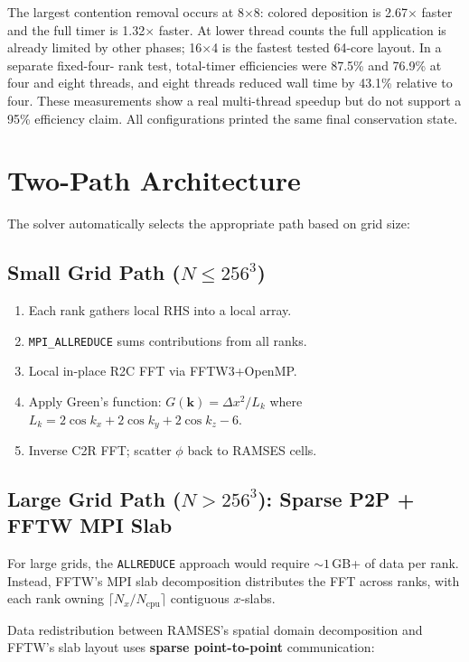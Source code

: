 \documentclass[11pt,fleqn]{book}
\begin{document}
The largest contention removal occurs at 8$\times$8: colored deposition is
2.67$\times$ faster and the full timer is 1.32$\times$ faster.  At lower
thread counts the full application is already limited by other phases;
16$\times$4 is the fastest tested 64-core layout.  In a separate fixed-four-
rank test, total-timer efficiencies were 87.5\% and 76.9\% at four and eight
threads, and eight threads reduced wall time by 43.1\% relative to four.
These measurements show a real multi-thread speedup but do not support a
95\% efficiency claim.  All configurations printed the same final
conservation state.

\section{Two-Path Architecture}

The solver automatically selects the appropriate path based on grid size:

\subsection{Small Grid Path ($N \le 256^3$)}

\begin{enumerate}[nosep]
  \item Each rank gathers local RHS into a local array.
  \item \texttt{MPI\_ALLREDUCE} sums contributions from all ranks.
  \item Local in-place R2C FFT via FFTW3+OpenMP.
  \item Apply Green's function: $G(\mathbf{k}) = \Delta x^2 / L_k$ where $L_k = 2\cos k_x + 2\cos k_y + 2\cos k_z - 6$.
  \item Inverse C2R FFT; scatter $\phi$ back to RAMSES cells.
\end{enumerate}

\subsection{Large Grid Path ($N > 256^3$): Sparse P2P + FFTW MPI Slab}

For large grids, the \texttt{ALLREDUCE} approach would require ${\sim}1$\,GB+ of data per rank.  Instead, FFTW's MPI slab decomposition distributes the FFT across ranks, with each rank owning $\lceil N_x / N_{\text{cpu}} \rceil$ contiguous $x$-slabs.

Data redistribution between RAMSES's spatial domain decomposition and FFTW's slab layout uses \textbf{sparse point-to-point} communication:
\end{document}
